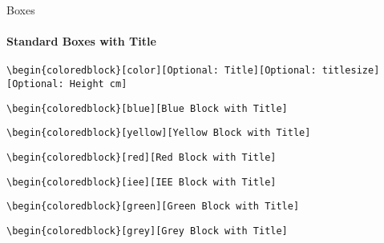\documentclass[aspectratio=169]{beamer}
\begin{document}
\begin{frame}{Boxes}
    \framesubtitle{Standard Boxes with Title}

    \footnotesize\centering\texttt{\textbackslash begin\{coloredblock\}[color][Optional:~Title][Optional:~titlesize][Optional:~Height cm]}
    
    \begin{minipage}[t]{0.49\textwidth}
    
        \begin{coloredblock}
            \texttt{\textbackslash begin\{coloredblock\}[blue][Blue Block with Title]}\strut
        \end{coloredblock}

        \begin{coloredblock}
            \texttt{\textbackslash begin\{coloredblock\}[yellow][Yellow Block with Title]}\strut
        \end{coloredblock}

        \begin{coloredblock}
            \texttt{\textbackslash begin\{coloredblock\}[red][Red Block with Title]}\strut
        \end{coloredblock}
        
    \end{minipage}
    \hfill
    \begin{minipage}[t]{0.49\textwidth}
    
        \begin{coloredblock}
            \texttt{\textbackslash begin\{coloredblock\}[iee][IEE Block with Title]}\strut
        \end{coloredblock}

        \begin{coloredblock}
            \texttt{\textbackslash begin\{coloredblock\}[green][Green Block with Title]}\strut
        \end{coloredblock}

        \begin{coloredblock}
            \texttt{\textbackslash begin\{coloredblock\}[grey][Grey Block with Title]}\strut
        \end{coloredblock}
        
    \end{minipage}
\end{frame}
\end{document}
